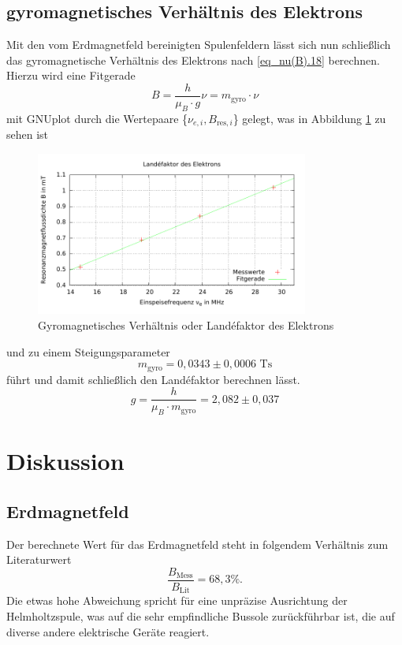 \renewcommand{\arraystretch}{1.0}
\subsection{gyromagnetisches Verhältnis des Elektrons}
Mit den vom Erdmagnetfeld bereinigten Spulenfeldern lässt sich nun schließlich das gyromagnetische Verhältnis des Elektrons nach \eqref{eq_nu(B).18}
berechnen. Hierzu wird eine Fitgerade 
\begin{equation}
 B = \frac{h}{\mu_B \cdot g} \nu = m_\text{gyro} \cdot \nu
\end{equation}
mit GNUplot durch die Wertepaare \{$\nu_{e,i},B_{\text{res},i}$\} gelegt, was in Abbildung \ref{pic_gyro} zu sehen ist
\begin{figure}[H]
\includegraphics[width=0.8\textwidth]{../pics/landefaktor.pdf}
\caption{Gyromagnetisches Verhältnis oder Landéfaktor des Elektrons}
\label{pic_gyro}
\end{figure}
und zu einem Steigungsparameter 
\begin{equation}
m_\text{gyro} = 0,0343 \pm 0,0006 \text{ Ts}
\end{equation}
führt und damit schließlich den Landéfaktor berechnen lässt.
\begin{equation}
 g = \frac{h}{\mu_B\cdot m_\text{gyro}} = 2,082 \pm 0,037
\end{equation}


\section{Diskussion}
\subsection{Erdmagnetfeld}
Der berechnete Wert für das Erdmagnetfeld steht in folgendem Verhältnis zum Literaturwert \cite{ErdB}
\begin{equation}
 \frac{B_\text{Mess}}{B_\text{Lit}} = 68,3 \%.
\end{equation}
Die etwas hohe Abweichung spricht für eine unpräzise Ausrichtung der Helmholtzspule, was auf die sehr empfindliche Bussole zurückführbar ist, die
auf diverse andere elektrische Geräte reagiert.

